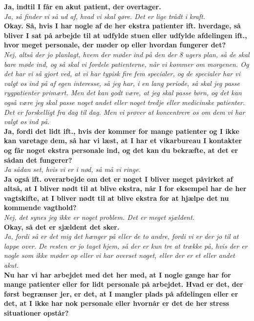 \noindent
\textbf{Ja, indtil I får en akut patient, der overtager.}\\
\noindent
\textit{Ja, så finder vi så ud af, hvad vi skal gøre. Det er lige trådt i kraft.}\\
\noindent
\textbf{Okay. Så, hvis I har nogle af de her ekstra patienter ift. hverdage, så bliver I sat på arbejde til at udfylde stuen eller udfylde afdelingen ift., hvor meget personale, der møder op eller hvordan fungerer det?}\\
\noindent
\textit{Nej, altså der jo planlagt, hvem der møder ind på den der 8 ugers plan, så de skal bare møde ind, og så skal vi fordele patienterne, når vi kommer om morgenen. Og det har vi så gjort ved, at vi har typisk fire fem specialer, og de specialer har vi valgt os ind på af egen interesse, så jeg har, i en lang periode, så skal jeg passe rygpatienter primært. Men det kan godt være, at jeg skal passe børn, og det kan også være jeg skal passe noget andet eller noget tredje eller medicinske patienter. Det er forskelligt fra dag til dag. Men vi prøver at koncentrere os om dem vi har valgt os ind på.}\\
\noindent
\textbf{Ja, fordi det lidt ift., hvis der kommer for mange patienter og I ikke kan varetage dem, så har vi læst, at I har et vikarbureau I kontakter og får noget ekstra personale ind, og det kan du bekræfte, at det er sådan det fungerer?} \\
\noindent
\textit{Ja sådan set, hvis vi er i nød, så må vi ringe.}\\
\noindent
\textbf{Ja også ift. overarbejde om det er noget I bliver meget påvirket af altså, at I bliver nødt til at blive ekstra, når I for eksempel har de her vagtskifte, at I bliver nødt til at blive ekstra for at hjælpe det nu kommende vagthold?}\\
\noindent
\textit{Nej, det synes jeg ikke er noget problem. Det er meget sjældent.}\\
\noindent
\textbf{Okay, så det er sjældent det sker.}\\
\noindent
\textit{Ja, fordi så er det mig det hænger på eller de to andre, fordi vi er der jo til at lappe over. De resten er jo taget hjem, så der er kun tre at trække på, hvis der er nogle som ikke møder op eller vi har overset noget, eller der er et eller andet akut.}\\
\noindent
\textbf{Nu har vi har arbejdet med det her med, at I nogle gange har for mange patienter eller for lidt personale på arbejdet. Hvad er det, der først begrænser jer, er det, at I mangler plads på afdelingen eller er det, at I ikke har nok personale eller hvornår er det de her stress situationer opstår?}\\
